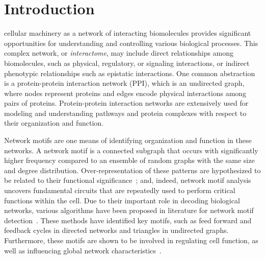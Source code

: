 \documentclass[10pt, journal, compsoc, final]{IEEEtran}
\begin{document}
\maketitle


\IEEEdisplaynontitleabstractindextext




\IEEEpeerreviewmaketitle





\section{Introduction}\label{sec:introduction}







 cellular machinery as a network of interacting biomolecules
provides significant opportunities for understanding and controlling various biological
processes. This complex network, or \textit{interactome}, may include direct relationships
among biomolecules, such as physical, regulatory, or signaling interactions, or
indirect phenotypic relationships such as epistatic interactions. One common 
abstraction is a protein-protein interaction network (PPI), which is an 
undirected graph, where nodes represent proteins and
edges encode physical interactions among pairs of proteins.
Protein-protein interaction networks are extensively used for modeling and understanding
pathways and protein complexes with respect to their organization and function.

Network motifs are one means of identifying organization and function in these networks.
A network motif is a connected subgraph that occurs
with significantly higher frequency compared to an ensemble of random
graphs with the same size and degree distribution. Over-representation of these patterns are hypothesized to be related to their functional significance~\cite{Milo};
and, indeed, network motif analysis uncovers fundamental circuits that are repeatedly used
to perform critical functions within the cell. 
Due to their important role in decoding
biological networks, various algorithms have been proposed in literature for network
motif detection~\cite{Mfinder, Pajek, MAVisto,  FANMOD, Kavosh}. 
These methods have
identified key motifs, such as feed forward and feedback cycles in directed networks
and triangles in undirected graphs. Furthermore, these motifs are shown to be
involved in regulating cell function, as well as influencing global network
characteristics~\cite{Mangan2003,Shen-Orr2002,Chung2015,Barabasi2004,Wuchty2003}.
\end{document}
